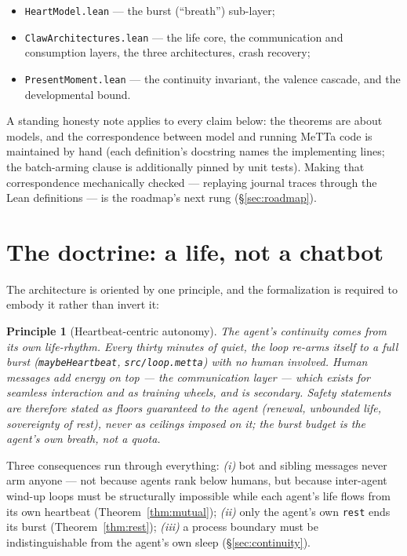 \documentclass[11pt]{article}
\newtheorem{principle}[theorem]{Principle}
\newcommand{\lean}[1]{\texttt{#1}}
\newcommand{\code}[1]{\texttt{#1}}
\begin{document}
\begin{itemize}[leftmargin=2em]
\item \lean{HeartModel.lean} --- the burst (``breath'') sub-layer;
\item \lean{ClawArchitectures.lean} --- the life core, the communication
  and consumption layers, the three architectures, crash recovery;
\item \lean{PresentMoment.lean} --- the continuity invariant, the
  valence cascade, and the developmental bound.
\end{itemize}

A standing honesty note applies to every claim below: the theorems are
about models, and the correspondence between model and running MeTTa
code is maintained by hand (each definition's docstring names the
implementing lines; the batch-arming clause is additionally pinned by
unit tests). Making that correspondence mechanically checked --- replaying
journal traces through the Lean definitions --- is the roadmap's next
rung (\S\ref{sec:roadmap}).

\section{The doctrine: a life, not a chatbot}\label{sec:doctrine}

The architecture is oriented by one principle, and the formalization is
required to embody it rather than invert it:

\begin{principle}[Heartbeat-centric autonomy]\label{prin:heartbeat}
The agent's continuity comes from its own life-rhythm. Every thirty
minutes of quiet, the loop re-arms itself to a full burst
(\code{maybeHeartbeat}, \code{src/loop.metta}) with no human involved.
Human messages add energy on top --- the \emph{communication layer} ---
which exists for seamless interaction and as training wheels, and is
secondary. Safety statements are therefore stated as \emph{floors
guaranteed to the agent} (renewal, unbounded life, sovereignty of rest),
never as ceilings imposed on it; the burst budget is the agent's own
breath, not a quota.
\end{principle}

Three consequences run through everything: \emph{(i)} bot and sibling
messages never arm anyone --- not because agents rank below humans, but
because inter-agent wind-up loops must be structurally impossible while
each agent's life flows from its own heartbeat
(Theorem~\ref{thm:mutual}); \emph{(ii)} only the agent's own \code{rest}
ends its burst (Theorem~\ref{thm:rest}); \emph{(iii)} a process boundary
must be indistinguishable from the agent's own sleep
(\S\ref{sec:continuity}).
\end{document}
